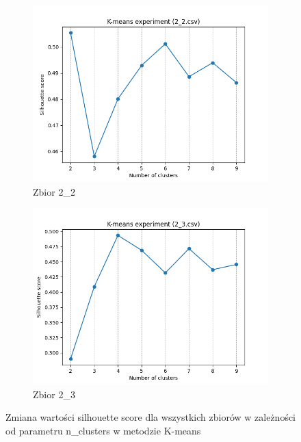 \documentclass[12pt]{article}
\begin{document}
\begin{figure}[H]
\begin{subfigure}[b]{0.3\textwidth}
        \includegraphics[width=\linewidth]{img/exp_1/kmeans/2_2_scores.png}
        \caption{Zbior 2\_2}
    \end{subfigure}
    \hfill
    \begin{subfigure}[b]{0.3\textwidth}
        \includegraphics[width=\linewidth]{img/exp_1/kmeans/2_3_scores.png}
        \caption{Zbior 2\_3}
    \end{subfigure}
    \caption{\centering Zmiana wartości silhouette score dla wszystkich zbiorów w zależności od parametru n\_clusters w metodzie K-means}
\end{figure}
\end{document}
